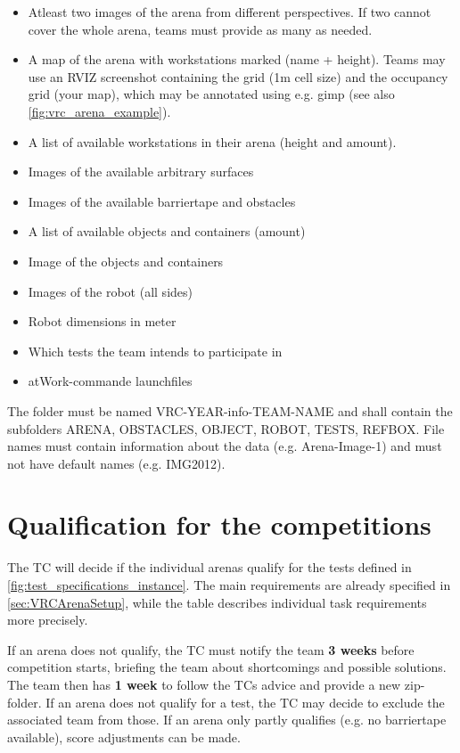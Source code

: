 \begin{itemize}
\item Atleast two images of the arena from different perspectives. If two cannot cover the whole arena, teams must provide as many as needed.
\item A map of the arena with workstations marked (name + height). Teams may use an RVIZ screenshot containing the grid (1m cell size) and the occupancy grid (your map), which may be annotated using e.g. gimp (see also \ref{fig:vrc_arena_example}).
\item A list of available workstations in their arena (height and amount).
\item Images of the available arbitrary surfaces
\item Images of the available barriertape and obstacles
\item A list of available objects and containers (amount)
\item Image of the objects and containers
\item Images of the robot (all sides)
\item Robot dimensions in meter
\item Which tests the team intends to participate in
\item atWork-commande launchfiles
\end{itemize}

The folder must be named VRC-YEAR-info-TEAM-NAME and shall contain the subfolders ARENA, OBSTACLES, OBJECT, ROBOT, TESTS, REFBOX. 
File names must contain information about the data (e.g. Arena-Image-1) and must not have default names (e.g. IMG2012).

\section{Qualification for the competitions}

The TC will decide if the individual arenas qualify for the tests defined in \ref{fig:test_specifications_instance}. 
The main requirements are already specified in \ref{sec:VRCArenaSetup}, while the table describes individual task requirements more precisely.
 
If an arena does not qualify, the TC must notify the team \textbf{3 weeks} before competition starts, 
briefing the team about shortcomings and possible solutions. 
The team then has \textbf{1 week} to follow the TCs advice and provide a new zip-folder.
If an arena does not qualify for a test, the TC may decide to exclude the associated team from those.
If an arena only partly qualifies (e.g. no barriertape available), score adjustments can be made.


